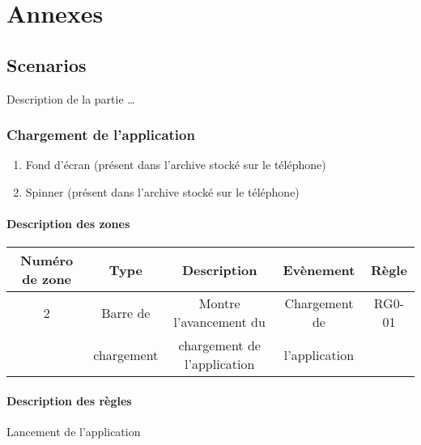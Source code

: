 \documentclass{report}
\begin{document}
\chapter{Annexes}

	\section{Scenarios}
	
		Description de la partie \ldots

\newpage
	
	\subsection{Chargement de l'application}
	
		\hypertarget{Chargement de l'application}{}
		\label{Chargement de l'application}

		\begin{center}
			
		\end{center}
		
		\begin{enumerate}
		  \item Fond d'écran (présent dans l'archive stocké sur le téléphone)
		  \item Spinner (présent dans l'archive stocké sur le téléphone)
		\end{enumerate}
		
		\subsubsection{Description des zones}

			\begin{tabular}{|c|c|c|c|c|} \hline
				Numéro de zone & Type  & Description & Evènement &	Règle \\\hline 
				2 & Barre de & Montre l'avancement du & Chargement de & RG0-01\\
				  & chargement & chargement de l'application & l'application &\\\hline
			\end{tabular}
		
		\subsubsection{Description des règles}
		Lancement de l’application 
		
\end{document}
